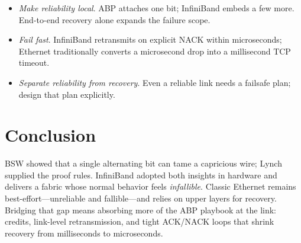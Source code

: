 \documentclass[../../../OAE-SPEC-MAIN.tex]{subfiles}
\begin{document}
\begin{itemize}
\item \emph{Make reliability local}.  ABP attaches one bit; InfiniBand embeds
      a few more.  End-to-end recovery alone expands the failure scope.
\item \emph{Fail fast}.  InfiniBand retransmits on explicit NACK within
      microseconds; Ethernet traditionally converts a microsecond drop into a
      millisecond TCP timeout.
\item \emph{Separate reliability from recovery}.  Even a reliable link needs
      a failsafe plan; design that plan explicitly.
\end{itemize}

\section{Conclusion}

\begin{highlightbox}[CONCLUSION:]
\noindent
BSW showed that a single alternating bit can tame a capricious wire; Lynch
supplied the proof rules.  InfiniBand adopted both insights in hardware and
delivers a fabric whose normal behavior feels \emph{infallible}.  Classic
Ethernet remains best-effort---unreliable and fallible---and relies on upper
layers for recovery.  Bridging that gap means absorbing more of the ABP
playbook at the link: credits, link-level retransmission, and tight ACK/NACK
loops that shrink recovery from milliseconds to microseconds.
\end{highlightbox}
 

%
%
%
%
\end{document}
